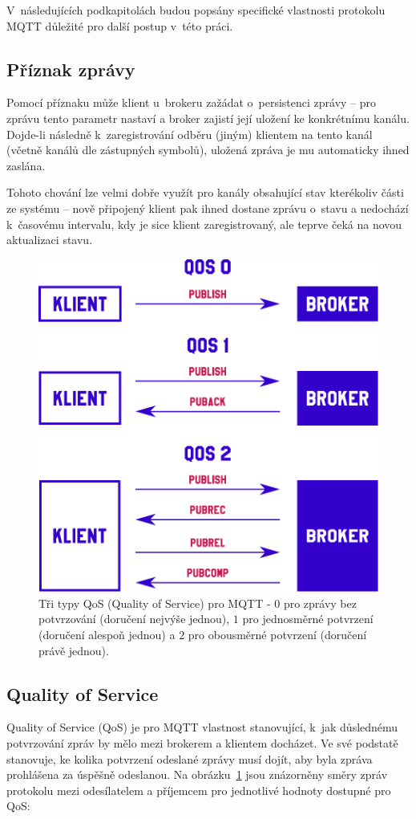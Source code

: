 V~následujících podkapitolách budou popsány specifické vlastnosti protokolu MQTT důležité pro další postup v~této
práci.

\subsection{Příznak zprávy }\label{subsec:priznak-zpravy-retain}
Pomocí příznaku  může klient u~brokeru zažádat o~persistenci zprávy -- pro zprávu tento parametr nastaví a
broker zajistí její uložení ke konkrétnímu kanálu.
Dojde-li následně k~zaregistrování odběru (jiným) klientem na tento kanál (včetně kanálů dle zástupných symbolů),
uložená zpráva je mu automaticky ihned zaslána.

Tohoto chování lze velmi dobře využít pro kanály obsahující stav kterékoliv části ze systému --
nově připojený klient pak ihned dostane zprávu o~stavu a nedochází k~časovému intervalu, kdy je sice klient
zaregistrovaný, ale teprve čeká na novou aktualizaci stavu.

\begin{figure}
    \centering
    \includegraphics[width=.6\textwidth]{figures/qos.pdf}
    \caption{Tři typy QoS (Quality of Service) pro MQTT - $0$ pro zprávy bez potvrzování (doručení nejvýše jednou),
    $1$ pro jednosměrné potvrzení (doručení alespoň jednou) a
    $2$ pro obousměrné potvrzení (doručení právě jednou).}
    \label{fig:mqtt-qos}
\end{figure}

\subsection{Quality of Service}\label{subsec:quality-of-service}
Quality of Service (QoS) je pro MQTT vlastnost stanovující, k~jak důslednému potvrzování zpráv by mělo mezi
brokerem a klientem docházet.
Ve své podstatě stanovuje, ke kolika potvrzení odeslané zprávy musí dojít, aby byla
zpráva prohlášena za úspěšně odeslanou.
Na obrázku~\ref{fig:mqtt-qos} jsou znázorněny směry zpráv protokolu mezi odesílatelem a příjemcem pro jednotlivé
hodnoty dostupné pro QoS:

